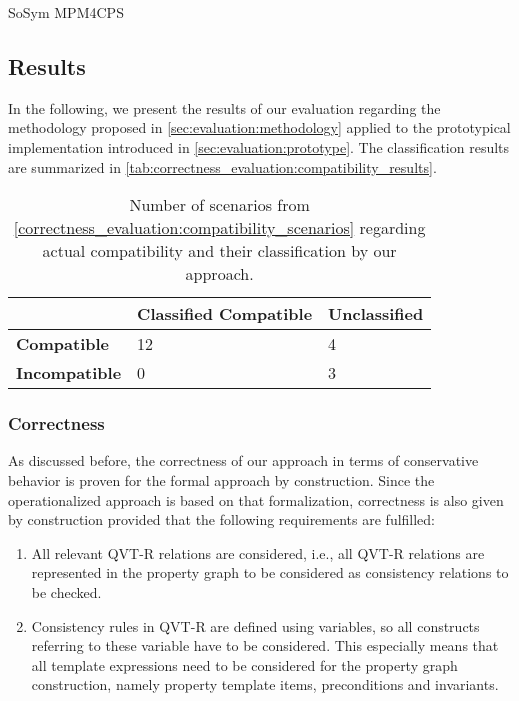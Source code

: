 \begin{copiedFrom}{SoSym MPM4CPS}

\subsection{Results}

In the following, we present the results of our evaluation regarding the methodology proposed in \autoref{sec:evaluation:methodology} applied to the prototypical implementation introduced in \autoref{sec:evaluation:prototype}.
The classification results are summarized in \autoref{tab:correctness_evaluation:compatibility_results}.

\begin{table}
    \centering
    \small
    \renewcommand{\arraystretch}{1.2}%
    \setlength\tabcolsep{4 pt}
    \begin{tabular}{L{2cm} C{3.5cm} C{2.3cm}}
        \toprule
         & \textbf{Classified Compatible} & \textbf{Unclassified} \\
         \midrule
         \textbf{Compatible} & 12 & 4\\
         \textbf{Incompatible} & 0 & 3\\
         \bottomrule
    \end{tabular}
    \caption[Correctness of compatibility classification results]{Number of scenarios from \autoref{correctness_evaluation:compatibility_scenarios} regarding actual compatibility and their classification by our approach.}
    \label{tab:correctness_evaluation:compatibility_results}
\end{table}

\subsubsection{Correctness}
As discussed before, the correctness of our approach in terms of conservative behavior is proven for the formal approach by construction.
Since the operationalized approach is based on that formalization, correctness is also given by construction provided that the following requirements are fulfilled:
\begin{enumerate}
    \item All relevant QVT-R relations are considered, i.e., all QVT-R relations are represented in the property graph to be considered as consistency relations to be checked.
    \item Consistency rules in QVT-R are defined using variables, so all constructs referring to these variable have to be considered. This especially means that all  template expressions need to be considered for the property graph construction, namely property template items, preconditions and invariants.
\end{enumerate}


\end{copiedFrom}
